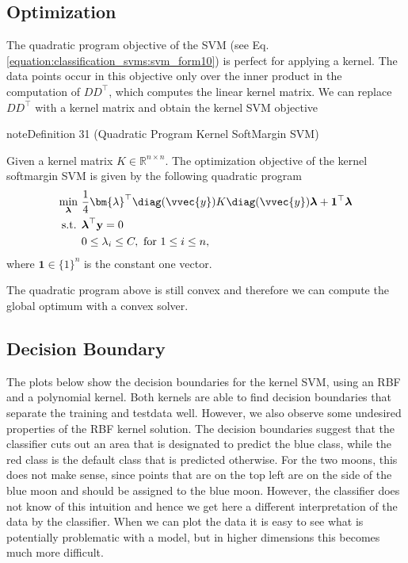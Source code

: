 \documentclass[letterpaper,10pt,english]{jupyterBook}
\begin{document}
\subsection{Optimization}
\label{\detokenize{classification_kernel_svm:optimization}}
\sphinxAtStartPar
The quadratic program objective of the SVM (see Eq.\eqref{equation:classification_svms:svm_form10}) is perfect for applying a kernel. The data points occur in this objective only over the inner product in the computation of \(DD^\top\), which computes the linear kernel matrix. We can replace \(DD^\top\) with a kernel matrix and obtain the kernel SVM objective
\label{classification_kernel_svm:definition-2}
\begin{sphinxadmonition}{note}{Definition 31 (Quadratic Program Kernel Soft\sphinxhyphen{}Margin SVM)}



\sphinxAtStartPar
Given a kernel matrix \(K\in\mathbb{R}^{n\times n}\). The optimization objective of the kernel soft\sphinxhyphen{}margin SVM is given by the following quadratic program
\begin{equation}\label{equation:classification_kernel_svm:kernel_svm}
\begin{split}\begin{align*}
\min_{\boldsymbol{\lambda}}  \ & \frac14\bm{\lambda}^\top  \diag(\vvec{y})K\diag(\vvec{y}) \boldsymbol{\lambda} + {\bf 1}^\top \boldsymbol{\lambda} \\
\text{s.t. } &   \boldsymbol{\lambda}^\top{\bf y}  = 0 \\
&  0 \leq \lambda_{i} \leq C, \text{ for }1\leq i\leq n,
\end{align*} \end{split}
\end{equation}
\sphinxAtStartPar
where \(\mathbf{1}\in\{1\}^n\) is the constant one vector.
\end{sphinxadmonition}

\sphinxAtStartPar
The quadratic program above is still convex and therefore we can compute the global optimum with a convex solver.


\subsection{Decision Boundary}
\label{\detokenize{classification_kernel_svm:decision-boundary}}
\sphinxAtStartPar
The plots below show the decision boundaries for the kernel SVM, using an RBF and a polynomial kernel. Both kernels are able to find decision boundaries that separate the training and test\sphinxhyphen{}data well. However, we also observe some undesired properties of the RBF kernel solution. The decision boundaries suggest that the classifier cuts out an area that is designated to predict the blue class, while the red class is the default class that is predicted otherwise. For the two moons, this does not make sense, since points that are on the top left are on the side of the blue moon and should be assigned to the blue moon. However, the classifier does not know of this intuition and hence we get here a different interpretation of the data by the classifier. When we can plot the data it is easy to see what is potentially problematic with a model, but in higher dimensions this becomes much more difficult.
\end{document}
